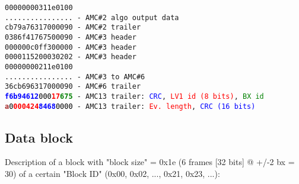 \texttt{00000000311e0100}\\
\texttt{................ - AMC\#2 algo output data}\\
\texttt{cb79a76317000090 - AMC\#2 trailer}\\
\texttt{0386f41767500090 - AMC\#3 header}\\
\texttt{000000c0ff300000 - AMC\#3 header}\\
\texttt{0000115200030202 - AMC\#3 header}\\
\texttt{00000000211e0100}\\
\texttt{................ - AMC\#3 to AMC\#6}\\
\texttt{36cb696317000090 - AMC\#6 trailer}\\
\texttt{\textcolor{blue}{\textbf{f6b94612}}\textcolor{black}{000}\textcolor{red}{\textbf{17}}\textcolor{green}{\textbf{675}} - AMC13 trailer: \textcolor{blue}{CRC}, \textcolor{red}{LV1 id (8 bits)}, \textcolor{green}{BX id}}\\
\texttt{\textcolor{brown}{\textbf{a}}\textcolor{black}{0}\textcolor{red}{\textbf{000424}}\textcolor{blue}{\textbf{8468}}\textcolor{black}{0000} - AMC13 trailer: \textcolor{red}{Ev. length}, \textcolor{blue}{CRC (16 bits)}}\\

\clearpage

\subsection{Data block}
\label{sec:data_block}
Description of a block with "block size" = 0x1e (6 frames [32 bits] @ +/-2 bx = 30) of a certain "Block ID" (0x00, 0x02, ..., 0x21, 0x23, ...):\\

